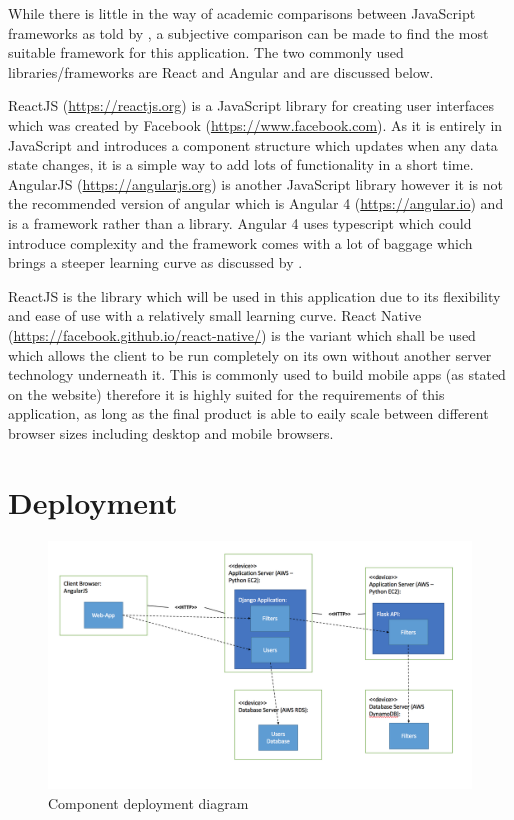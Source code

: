 \documentclass[a4paper,12pt]{report}
\begin{document}
        While there is little in the way of academic comparisons between JavaScript frameworks as told by \cite{graziotin2013making}, a subjective comparison can be made to find the most suitable framework for this application. The two commonly used libraries/frameworks are React and Angular and are discussed below.

        ReactJS (\url{https://reactjs.org}) is a JavaScript library for creating user interfaces which was created by Facebook (\url{https://www.facebook.com}). As it is entirely in JavaScript and introduces a component structure which updates when any data state changes, it is a simple way to add lots of functionality in a short time. AngularJS (\url{https://angularjs.org}) is another JavaScript library however it is not the recommended version of angular which is Angular 4 (\url{https://angular.io}) and is a framework rather than a library. Angular 4 uses typescript which could introduce complexity and the framework comes with a lot of baggage which brings a steeper learning curve as discussed by \cite{neuhaus_2017}.

        ReactJS is the library which will be used in this application due to its flexibility and ease of use with a relatively small learning curve. React Native (\url{https://facebook.github.io/react-native/}) is the variant which shall be used which allows the client to be run completely on its own without another server technology underneath it. This is commonly used to build mobile apps (as stated on the website) therefore it is highly suited for the requirements of this application, as long as the final product is able to eaily scale between different browser sizes including desktop and mobile browsers.

    \section{Deployment}

      \begin{figure}[ht]
        \centering
        \includegraphics[width=\linewidth]{deployment-diagram}
        \caption{Component deployment diagram}
        \label{fig:deployment-diagram}
      \end{figure}
\end{document}
